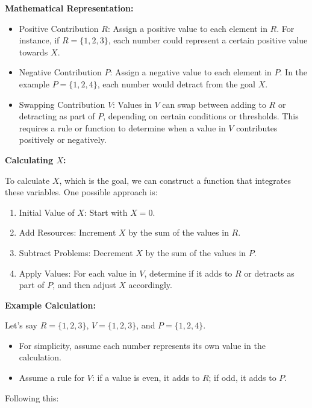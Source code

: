 \documentclass{article}
\begin{document}
\textbf{Mathematical Representation:}

\begin{itemize}
    \item Positive Contribution \( R \): Assign a positive value to each element in \( R \). For instance, if \( R = \{1, 2, 3\} \), each number could represent a certain positive value towards \( X \).
    \item Negative Contribution \( P \): Assign a negative value to each element in \( P \). In the example \( P = \{1, 2, 4\} \), each number would detract from the goal \( X \).
    \item Swapping Contribution \( V \): Values in \( V \) can swap between adding to \( R \) or detracting as part of \( P \), depending on certain conditions or thresholds. This requires a rule or function to determine when a value in \( V \) contributes positively or negatively.
\end{itemize}

\textbf{Calculating \( X \):}

To calculate \( X \), which is the goal, we can construct a function that integrates these variables. One possible approach is:

\begin{enumerate}
    \item Initial Value of \( X \): Start with \( X = 0 \).
    \item Add Resources: Increment \( X \) by the sum of the values in \( R \).
    \item Subtract Problems: Decrement \( X \) by the sum of the values in \( P \).
    \item Apply Values: For each value in \( V \), determine if it adds to \( R \) or detracts as part of \( P \), and then adjust \( X \) accordingly.
\end{enumerate}

\textbf{Example Calculation:}

Let's say \( R = \{1, 2, 3\} \), \( V = \{1, 2, 3\} \), and \( P = \{1, 2, 4\} \).

\begin{itemize}
    \item For simplicity, assume each number represents its own value in the calculation.
    \item Assume a rule for \( V \): if a value is even, it adds to \( R \); if odd, it adds to \( P \).
\end{itemize}

Following this:
\end{document}
